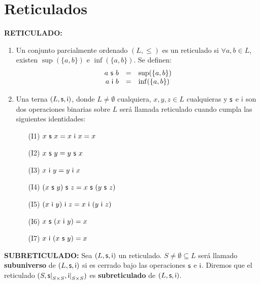 \section{Reticulados}

  \PN \textbf{RETICULADO:}
  \begin{enumerate}
    \item Un conjunto parcialmente ordenado $(L,\leq)$ es un reticulado si $\forall a, b \in L$, existen
    $\sup(\{a,b\})$ e $\inf(\{a,b\})$. Se definen:
    \[
      \begin{array}{rcl}
        a \ \mathsf{s} \ b &=& \sup(\{a,b\}) \\
        a \ \mathsf{i} \ b &=& \inf(\{a,b\})
      \end{array}
    \]

    \item Una terna $(L, \mathsf{s},\mathsf{i})$, donde $L \neq \emptyset$ cualquiera, $x, y, z \in L$ cualquieras y $\mathsf{s}$ e
    $\mathsf{i}$ son dos operaciones binarias sobre $L$ será llamada reticulado cuando cumpla las siguientes identidades:
    \begin{enumerate}
      \item[(I1)] $x \ \mathsf{s} \ x = x \ \mathsf{i} \ x = x$
      \item[(I2)] $x \ \mathsf{s} \ y = y \ \mathsf{s} \ x$
      \item[(I3)] $x \ \mathsf{i} \ y = y \ \mathsf{i} \ x$
      \item[(I4)] $(x \ \mathsf{s} \ y) \ \mathsf{s} \ z = x \ \mathsf{s} \ (y \ \mathsf{s} \ z)$
      \item[(I5)] $(x \ \mathsf{i} \ y) \ \mathsf{i} \ z = x \ \mathsf{i} \ (y \ \mathsf{i} \ z)$
      \item[(I6)] $x \ \mathsf{s} \ (x \ \mathsf{i} \ y) = x$
      \item[(I7)] $x \ \mathsf{i} \ (x \ \mathsf{s} \ y) = x$
    \end{enumerate}
  \end{enumerate}

  \vspace{3mm}
  \PN \textbf{SUBRETICULADO:} Sea $(L, \mathsf{s}, \mathsf{i})$ un reticulado. $S \neq \emptyset \subseteq L$ será
  llamado \textbf{subuniverso} de $(L, \mathsf{s}, \mathsf{i})$ si es cerrado bajo las operaciones $\mathsf{s}$ e $\mathsf{i}$. Diremos que el
  reticulado $(S, \mathsf{s}\mathrm{\mid}_{S \times S}, \mathsf{i}\mathrm{\mid}_{S \times S})$ es \textbf{subreticulado} de
  $(L, \mathsf{s}, \mathsf{i})$.

